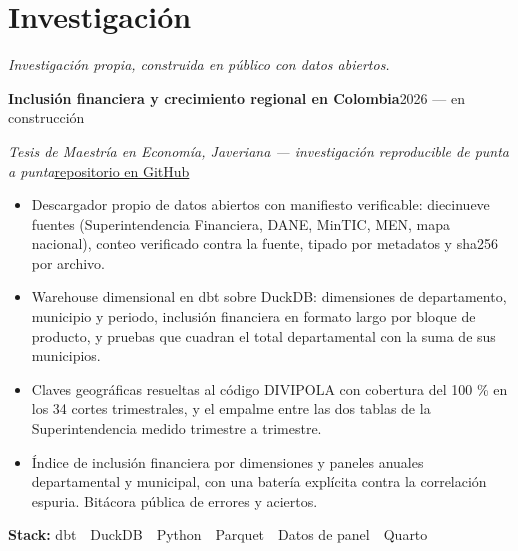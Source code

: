\documentclass[a4paper,10pt]{article}
\newcommand{\headline}[2]{\needspace{3\baselineskip}\textbf{\color{ink}#1}\hfill{\small #2}\par}
\newcommand{\subline}[2]{\textit{#1}\hfill{\small #2}\par}
\begin{document}
\section*{Investigación}
{\small\itshape Investigación propia, construida en público con datos abiertos.}\par\vspace{3pt}
\headline{Inclusión financiera y crecimiento regional en Colombia}{2026 --- en construcción}
\subline{Tesis de Maestría en Economía, Javeriana --- investigación reproducible de punta a punta}{\href{https://github.com/DavinsonR/financial-inclusion-colombia}{repositorio en GitHub}}
\begin{itemize}[leftmargin=1.1em, itemsep=0pt, topsep=1pt, parsep=0pt]
  \item Descargador propio de datos abiertos con manifiesto verificable: diecinueve fuentes (Superintendencia Financiera, DANE, MinTIC, MEN, mapa nacional), conteo verificado contra la fuente, tipado por metadatos y sha256 por archivo.
  \item Warehouse dimensional en dbt sobre DuckDB: dimensiones de departamento, municipio y periodo, inclusión financiera en formato largo por bloque de producto, y pruebas que cuadran el total departamental con la suma de sus municipios.
  \item Claves geográficas resueltas al código DIVIPOLA con cobertura del 100 \% en los 34 cortes trimestrales, y el empalme entre las dos tablas de la Superintendencia medido trimestre a trimestre.
  \item Índice de inclusión financiera por dimensiones y paneles anuales departamental y municipal, con una batería explícita contra la correlación espuria. Bitácora pública de errores y aciertos.
\end{itemize}
{\small\textbf{Stack:} dbt \,\textperiodcentered\, DuckDB \,\textperiodcentered\, Python \,\textperiodcentered\, Parquet \,\textperiodcentered\, Datos de panel \,\textperiodcentered\, Quarto}\par
\vspace{4pt}
\end{document}
